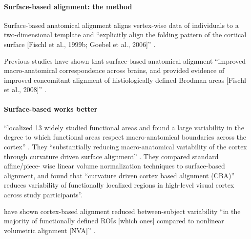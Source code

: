 \paragraph{Surface-based alignment: the method}

Surface-based anatomical alignment \citep{fischl1999cortical} aligns vertex-wise
data of individuals to a two-dimensional template \citep[e.g., FreeSurfer
fsaverage template;][]{fischl1999high} and ``explicitly align the folding
pattern of the cortical surface [Fischl et al., 1999b; Goebel et al., 2006]''
\citep{frost2012measuring}.

Previous studies have shown that surface-based anatomical alignment ``improved
macro-anatomical correspondence across brains, and provided evidence of
improved concomitant alignment of histiologically defined Brodman areas [Fischl
et al., 2008]'' \citep{frost2012measuring}.


\paragraph{Surface-based works better}


\citet{frost2012measuring} ``localized 13 widely studied functional areas and
found a large variability in the degree to which functional areas respect
macro-anatomical boundaries across the cortex'' \citep{frost2012measuring}.
%
They ``substantially reducing macro-anatomical variability of the cortex through
curvature driven surface alignment'' \citep{frost2012measuring}.
They compared standard affine/piece- wise linear volume normalization techniques
to surface-based alignment,
%
and found that ``curvature driven cortex based alignment
(CBA)'' reduces variability of functionally localized regions in high-level
visual cortex across study participants''.



\citet{rosenke2021probabilistic} have shown cortex-based alignment reduced
between-subject variability ``in the majority of functionally defined ROIs
[which ones] compared to nonlinear volumetric alignment [NVA]''
\citep{rosenke2021probabilistic}.




